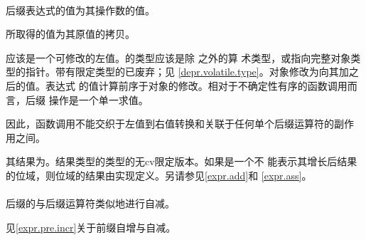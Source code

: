 \paragraph{} %
后缀\tm{++}表达式的值为其操作数的值。

\begin{note}
  所取得的值为其原值的拷贝。
\end{note}

\oprnd{}应该是一个可修改的左值。\oprnd{}的类型应该是除 之外的算
术类型，或指向完整对象类型的指针。带有\volatile{}限定类型的\oprnd{}已废弃；见
\ref{depr.volatile.type}。\oprnd{}对象修改为向其加之后的值。\tm{++}表达式
的值计算前序于\oprnd{}对象的修改。相对于不确定性有序的函数调用而言，后缀\tm{++}
操作是一个单一求值。

\begin{note}
  因此，函数调用不能交织于左值到右值转换和关联于任何单个后缀\tm{++}运算符的副作
  用之间。
\end{note}

其结果为\prvalue{}。结果类型的\oprnd{}类型的无cv限定版本。如果\oprnd{}是一个不
能表示其增长后结果的位域，则位域的结果由实现定义。另请参见\ref{expr.add}和
\ref{expr.ass}。

\paragraph{} %
后缀\tm{--}的\oprnd{}与后缀\tm{++}运算符类似地进行自减。

\begin{note}
  见\ref{expr.pre.incr}关于前缀自增与自减。
\end{note}
